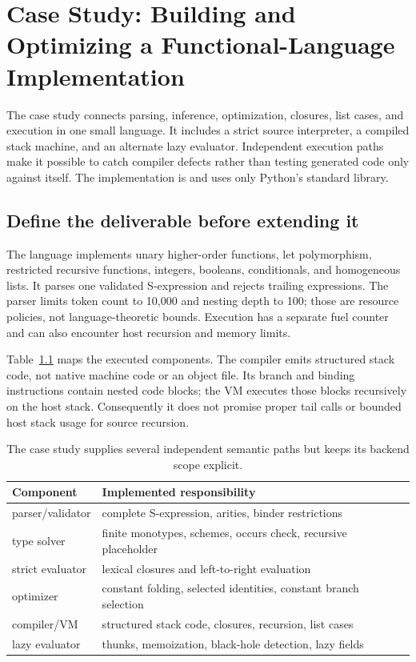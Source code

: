 \chapter{Case Study: Building and Optimizing a Functional-Language Implementation}
\label{ch:functional-case-study}

The case study connects parsing, inference, optimization, closures, list cases, and execution in one small language.
It includes a strict source interpreter, a compiled stack machine, and an alternate lazy evaluator.
Independent execution paths make it possible to catch compiler defects rather than testing generated code only against itself.
The implementation is  and uses only Python's standard library.

\section{Define the deliverable before extending it}
\label{sec:ch93-contract}
The language implements unary higher-order functions, let polymorphism, restricted recursive functions, integers, booleans, conditionals, and homogeneous lists.
It parses one validated S-expression and rejects trailing expressions.
The parser limits token count to 10,000 and nesting depth to 100; those are resource policies, not language-theoretic bounds.
Execution has a separate fuel counter and can also encounter host recursion and memory limits.

Table~\ref{tab:ch93-parts} maps the executed components.
The compiler emits structured stack code, not native machine code or an object file.
Its branch and binding instructions contain nested code blocks; the VM executes those blocks recursively on the host stack.
Consequently it does not promise proper tail calls or bounded host stack usage for source recursion.

\begin{table}[htbp]
\caption{The case study supplies several independent semantic paths but keeps its backend scope explicit.}
\label{tab:ch93-parts}
\centering
\begin{tabular}{ll}
\toprule
Component & Implemented responsibility \\
\midrule
parser/validator & complete S-expression, arities, binder restrictions \\
type solver & finite monotypes, schemes, occurs check, recursive placeholder \\
strict evaluator & lexical closures and left-to-right evaluation \\
optimizer & constant folding, selected identities, constant branch selection \\
compiler/VM & structured stack code, closures, recursion, list cases \\
lazy evaluator & thunks, memoization, black-hole detection, lazy fields \\
\bottomrule
\end{tabular}
\end{table}

